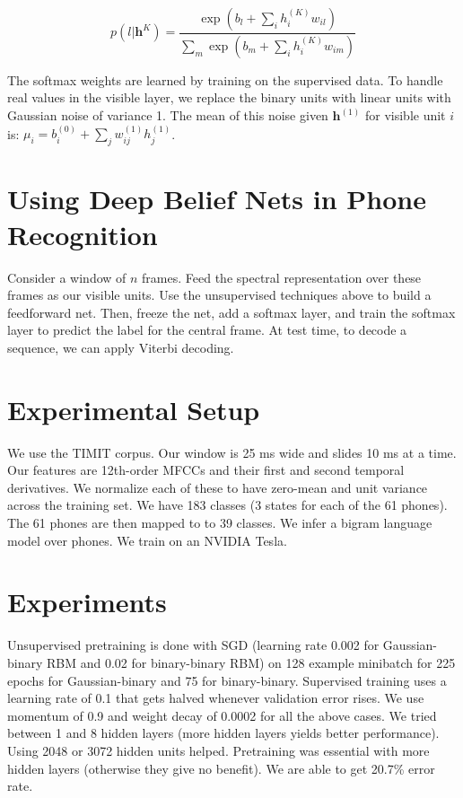 \documentclass[a4paper]{article}
\begin{document}
$$
p(l | \mathbf{h}^{K}) = \frac{
\exp(b_l + \sum_{i}{h_i^{(K)} w_{il}})
}{
\sum_{m}{\exp(b_m + \sum_{i}{h_i^{(K)} w_{im}})}
}
$$

The softmax weights are learned by training on the supervised data. To handle
real values in the visible layer, we replace the binary units with linear units
with Gaussian noise of variance 1. The mean of this noise given
$\mathbf{h}^{(1)}$ for visible unit $i$ is: $\mu_i = b_i^{(0)} +
\sum_{j}{w_{ij}^{(1)} h_j^{(1)}}$.

\section{Using Deep Belief Nets in Phone Recognition}
Consider a window of $n$ frames. Feed the spectral representation over these
frames as our visible units. Use the unsupervised techniques above to build
a feedforward net. Then, freeze the net, add a softmax layer, and train the
softmax layer to predict the label for the central frame. At test time, to
decode a sequence, we can apply Viterbi decoding.

\section{Experimental Setup}
We use the TIMIT corpus. Our window is 25 ms wide
and slides 10 ms at a time. Our features are 12th-order MFCCs and
their first and second temporal derivatives. We normalize each of these to
have zero-mean and unit variance across the training set. We have 183 classes
(3 states for each of the 61 phones). The 61 phones are then mapped to to 39
classes. We infer a bigram language model over phones. We train on an
NVIDIA Tesla.

\section{Experiments}
Unsupervised pretraining is done with SGD (learning rate 0.002 for
Gaussian-binary RBM and 0.02 for binary-binary RBM) on 128 example minibatch
for 225 epochs for Gaussian-binary and 75 for binary-binary. Supervised
training uses a learning rate of 0.1 that gets halved whenever validation
error rises. We use momentum of 0.9 and weight decay of 0.0002 for all the
above cases. We tried between 1 and 8 hidden layers (more hidden layers yields
better performance). Using 2048 or 3072 hidden units helped. Pretraining
was essential with more hidden layers (otherwise they give no benefit).
We are able to get 20.7\% error rate.
\end{document}
